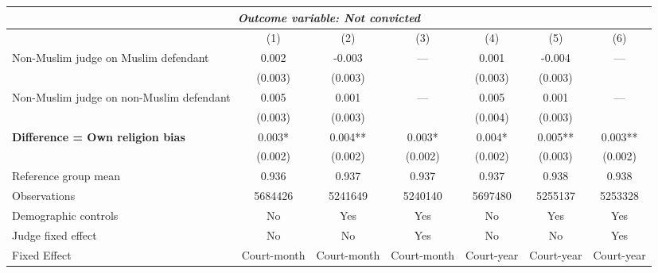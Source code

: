 {
\def\sym#1{\ifmmode^{#1}\else\(^{#1}\)\fi}
\begin{tabular}{l*{6}{c}}
  \hline\hline
\multicolumn{7}{c}{\textit{Outcome variable: Not convicted}}\\
\hline
&\multicolumn{1}{c}{(1)}&\multicolumn{1}{c}{(2)}&\multicolumn{1}{c}{(3)}&\multicolumn{1}{c}{(4)}&\multicolumn{1}{c}{(5)}&\multicolumn{1}{c}{(6)}\\
\hline
Non-Muslim judge on Muslim defendant \hspace{15mm}& 0.002 & -0.003 & --- & 0.001 & -0.004 & --- \\
& (0.003) & (0.003) &  & (0.003) &(0.003) &  \\
Non-Muslim judge on non-Muslim defendant \hspace{15mm}& 0.005 & 0.001 & ---& 0.005 & 0.001 & --- \\
& (0.003) & (0.003) &  & (0.004) & (0.003) &  \\
\textbf{Difference = Own religion bias} & 0.003* & 0.004** & 0.003* & 0.004* & 0.005** & 0.003** \\
& (0.002) & (0.002) & (0.002) & (0.002) & (0.003) & (0.002) \\
\hline
Reference group mean & 0.936 & 0.937 & 0.937 & 0.937 & 0.938 & 0.938 \\
Observations & 5684426 & 5241649 & 5240140 & 5697480 & 5255137 & 5253328 \\
Demographic controls & No & Yes & Yes & No & Yes & Yes \\
Judge fixed effect & No & No & Yes & No & No & Yes \\
Fixed Effect & Court-month & Court-month & Court-month & Court-year & Court-year & Court-year \\
\hline\hline
\end{tabular}
}
 
